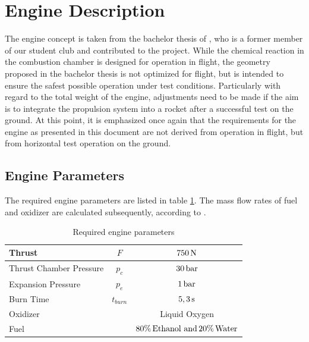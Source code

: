 \section{Engine Description}
    The engine concept is taken from the bachelor thesis of \citeauthor{mayer:2023} \cite{mayer:2023}, who is a former member of our student club and contributed to the project. While the chemical reaction in the combustion chamber is designed for operation in flight, the geometry proposed in the bachelor thesis is not optimized for flight, but is intended to ensure the safest possible operation under test conditions. Particularly with regard to the total weight of the engine, adjustments need to be made if the aim is to integrate the propulsion system into a rocket after a successful test on the ground. At this point, it is emphasized once again that the requirements for the engine as presented in this document are not derived from operation in flight, but from horizontal test operation on the ground.
    
    \subsection{Engine Parameters}
        The required engine parameters are listed in table \ref{tab:engine_parameters}. The mass flow rates of fuel and oxidizer are calculated subsequently, according to \citeauthor{mayer:2023}.
        
        \begin{table}[h]
            \centering
            \begin{tabular}{|l|c|c|}
                \hline
                Thrust & $F$ & $750 \,\text{N}$\\
                \hline
                Thrust Chamber Pressure & $p_c$ & $30 \,\text{bar}$\\
                \hline
                Expansion Pressure & $p_e$ & $1 \,\text{bar}$\\
                \hline
                Burn Time & $t_{burn}$ & $5,3\,\text{s}$\\
                \hline
                Oxidizer &  & Liquid Oxygen\\
                \hline
                Fuel &  & $80\% \,\text{Ethanol and}\,20\%\,\text{Water}$\\
                \hline
            \end{tabular}
            \caption[Required engine parameters]{Required engine parameters \cite[p.\,20]{mayer:2023}}
            \label{tab:engine_parameters}
        \end{table}

